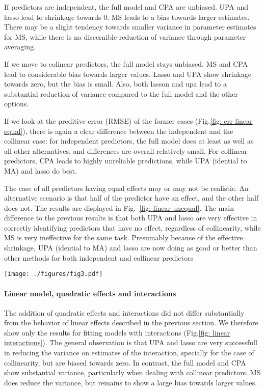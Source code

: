 \documentclass[5p]{elsarticle}
\begin{document}
If predictors are independent, the full model and CPA are unbiased. UPA and lasso lead to shrinkage towards 0. MS leads to a bias towards larger estimates. There may be a slight tendency towards smaller variance in parameter estimates for MS, while there is no discernible reduction of variance through parameter averaging. 

If we move to colinear predictors, the full model stays unbiased. MS and CPA lead to considerable bias towards larger values. Lasso and UPA show shrinkage towards zero, but the bias is small. Also, both lasson and upa lead to a substantial reduction of variance compared to the full model and the other options. 

If we look at the preditive error (RMSE) of the former cases (Fig.\ref{fig: err linear equal}), there is again a clear difference between the independent and the collinear case: for independent predictors, the full model does at least as well as all other alternatives, and differences are overall relatively small. For collinear predictors, CPA leads to highly unreliable predictions, while UPA (idential to MA) and lasso do best. 


The case of all predictors having equal effects may or may not be realistic. An alternative scenario is that half of the predictor have an effect, and the other half does not. The results are displayed in Fig.~\ref{fig: linear unequal}. The main difference to the previous results is that both UPA and lasso are very effective in correctly identifying predictors that have no effect, regardless of collinearity, while MS is very ineffective for the same task. Presumably because of the effective shrinkage, UPA (idential to MA) and lasso are now doing as good or better than other methods for both independent and collinear predictors 


\begin{figure*}\label{fig: linear unequal}
\texttt{[image: ./figures/fig3.pdf]}
\caption{Bias and predictive error of parameter estimates for linear regressions with independent (left) and colinear predictors.}
\end{figure*}


\paragraph{Linear model, quadratic effects and interactions} 

The addition of quadratic effects and interactions did not differ substantially from the behavior of linear effects described in the previous section. We therefore show only the results for fitting models with interactions (Fig.\ref{fig: linear interactions}). The general observation is that UPA and lasso are very successfull in reducing the variance on estimates of the interaction, specially for the case of collinearity, but are biased towards zero. In contrast, the full model and CPA show substantial variance, particularly when dealing with collinear predictors. MS does reduce the variance, but remains to show a large bias towards larger values. 
\end{document}
